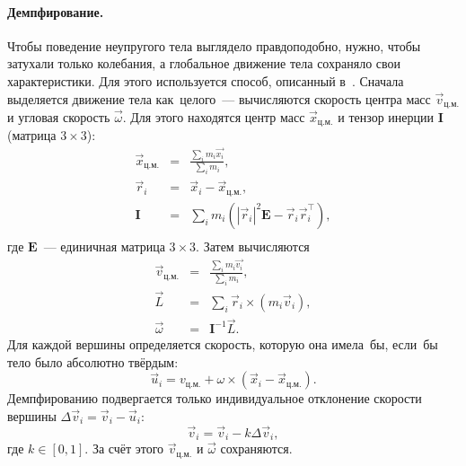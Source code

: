 \documentclass[a4paper, 14pt, titlepage]{extarticle}
\newcommand{\vect}[1]{\vec{#1}} %
\newcommand{\matx}[1]{\mathbf{#1}} %
\newcommand{\transposed}{\top} %
\begin{document}
        \paragraph{Демпфирование.} Чтобы поведение неупругого тела выглядело правдоподобно,
        нужно, чтобы затухали только колебания, а глобальное движение тела сохраняло свои характеристики.
        Для этого используется способ, описанный в~\cite[с.~5]{mueller-position-dynamics}. Сначала выделяется
        движение тела как~целого~--- вычисляются скорость центра масс $\vect{v}_{ц.м.}$ и угловая
        скорость $\vect{\omega}$. Для этого находятся центр масс
        $\vect{x}_{ц.м.}$ и тензор инерции $\matx I$ (матрица $3 \times 3$):
        \begin{eqnarray*}
          \vect{x}_{ц.м.} & = & \frac{\sum_i m_i \vect{x_i}}{\sum_i m_i},\\
          \vect{r}_i      & = & \vect{x}_i - \vect{x}_{ц.м.},\\
          \matx{I}        & = & \sum_i m_i ( |\vect{r}_i|^2 \matx E - \vect{r}_i \vect{r}_i^\transposed),\\
        \end{eqnarray*}
        где $\matx E$~--- единичная матрица $3 \times 3$. Затем вычисляются
        \begin{eqnarray*}
          \vect{v}_{ц.м.} & = & \frac{\sum_i m_i \vect{v_i}}{\sum_i m_i},\\
          \vect{L}        & = & \sum_i \vect{r}_i \times (m_i \vect{v}_i),\\
          \vect{\omega}   & = & \matx{I}^{-1} \vect{L}.
        \end{eqnarray*}
        Для каждой вершины определяется скорость,
        которую она имела~бы, если~бы тело было абсолютно твёрдым:
        \begin{equation}\label{eq:rigid_velocity}
          \vect{u}_i = v_{ц.м.} + \omega \times (\vect{x}_i - \vect{x}_{ц.м.}).
        \end{equation}
        Демпфированию подвергается только индивидуальное отклонение скорости вершины
        $\Delta \vect{v}_i = \vect{v}_i - \vect{u}_i$:
        \begin{equation}\label{eq:damping}
          \vect{v}_i = \vect{v}_i - k \Delta \vect{v}_i,
        \end{equation}
        где $k \in [0, 1]$. За счёт этого $\vect{v}_{ц.м.}$ и $\vect{\omega}$ сохраняются.
\end{document}
